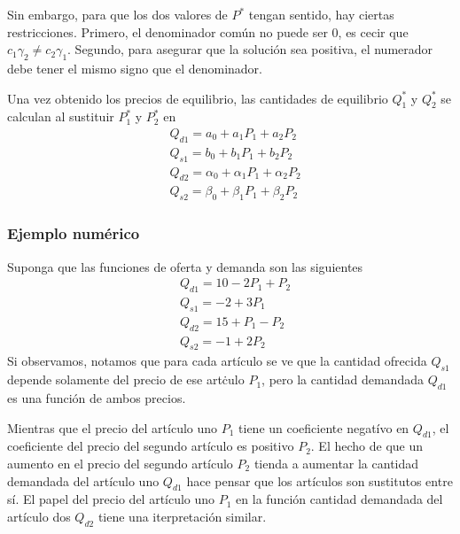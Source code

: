 Sin embargo, para que los dos valores de \(P^\ast\) tengan sentido, hay ciertas restricciones. Primero, el denominador común no puede ser \(0\), es cecir que \(c_1\gamma_2 \neq c_2\gamma_1\). Segundo, para asegurar que la solución sea positiva, el numerador debe tener el mismo signo que el denominador.

Una vez obtenido los precios de equilibrio, las cantidades de equilibrio \(Q_1^\ast\) y \(Q_2^\ast\) se calculan al sustituir \(P_1^\ast\) y \(P_2^\ast\) en 
\begin{equation}
    \begin{aligned}
        & Q_{d1}=a_0+a_1P_1+a_2P_2 \\ 
        & Q_{s1}=b_0+b_1P_1+b_2P_2 \\
        & Q_{d2}=\alpha_0+\alpha_1P_1+\alpha_2P_2 \\
        & Q_{s2}=\beta_0+\beta_1P_1+\beta_2P_2
    \end{aligned}
\end{equation}


\subsubsection{Ejemplo numérico}

Suponga que las funciones de oferta y demanda son las siguientes
\begin{equation}
    \begin{aligned}
        & Q_{d1}=10-2P_1+P_2 \\ 
        & Q_{s1}=-2+3P_1 \\
        & Q_{d2}=15+P_1-P_2 \\
        & Q_{s2}=-1+2P_2
    \end{aligned}
\end{equation}
Si observamos, notamos que para cada artículo se ve que la cantidad ofrecida \(Q_{s1}\) depende solamente del precio de ese artċulo \(P_1\), pero la cantidad demandada \(Q_{d1}\) es una función de ambos precios. 

Mientras que el precio del artículo uno \(P_1\) tiene un coeficiente negatívo en \(Q_{d1}\), el coeficiente del precio del segundo artículo es positivo \(P_2\). El hecho de que un aumento en el precio del segundo artículo \(P_2\) tienda a aumentar la cantidad demandada del artículo uno \(Q_{d1}\) hace pensar que los artículos son sustitutos entre sí. El papel del precio del artículo uno \(P_1\) en la función cantidad demandada del artículo dos \(Q_{d2}\) tiene una iterpretación similar. 


